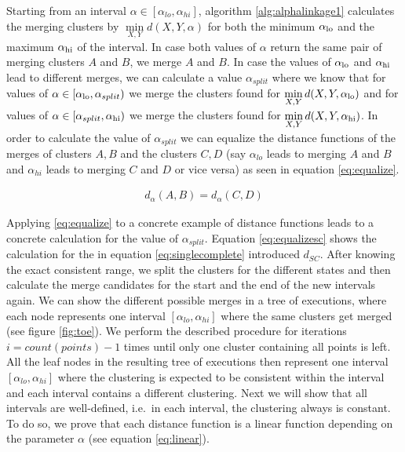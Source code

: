 Starting from an interval $\alpha \in [\alpha_{lo}, \alpha_{hi}]$, algorithm \ref{alg:alphalinkage1} calculates the merging clusters by $\min\limits_{X, Y} d(X,Y,\alpha)$ for both the minimum $\alpha_\text{lo}$ and the maximum $\alpha_\text{hi}$ of the interval. In case both values of $\alpha$ return the same pair of merging clusters $A$ and $B$, we merge $A$ and $B$. In case the values of $\alpha_\text{lo}$ and $\alpha_\text{hi}$ lead to different merges, we can calculate a value $\alpha_{split}$ where we know that for values of $\alpha \in [\alpha_\text{lo}, \alpha_{split})$ we merge the clusters found for $\min\limits_{X, Y} d(X,Y,\alpha_\text{lo})$ and for values of $\alpha \in [\alpha_{split}, \alpha_\text{hi})$ we merge the clusters found for $\min\limits_{X, Y} d(X,Y,\alpha_\text{hi})$. In order to calculate the value of $\alpha_{split}$ we can equalize the distance functions of the merges of clusters $A, B$ and the clusters $C, D$ (say $\alpha_{lo}$ leads to merging $A$ and $B$ and $\alpha_{hi}$ leads to merging $C$ and $D$ or vice versa) as seen in equation \ref{eq:equalize}. 

\begin{equation}
    \begin{aligned}
        d_{\alpha}(A,B) = d_{\alpha}(C,D)
    \end{aligned}
    \label{eq:equalize}
\end{equation}

Applying \ref{eq:equalize} to a concrete example of distance functions leads to a concrete calculation for the value of $\alpha_{split}$. Equation \ref{eq:equalizesc} shows the calculation for the in equation \ref{eq:singlecomplete} introduced $d_{SC}$. After knowing the exact consistent range, we split the clusters for the different states and then calculate the merge candidates for the start and the end of the new intervals again. We can show the different possible merges in a tree of executions, where each node represents one interval $[\alpha_{lo}, \alpha_{hi}]$ where the same clusters get merged (see figure \ref{fig:toe}). We perform the described procedure for iterations $i = count(points) -1$ times until only one cluster containing all points is left. All the leaf nodes in the resulting tree of executions then represent one interval $[\alpha_{lo}, \alpha_{hi}]$ where the clustering is expected to be consistent within the interval and each interval contains a different clustering. Next we will show that all intervals are well-defined, i.e.\ in each interval, the clustering always is constant. To do so, we prove that each distance function is a linear function depending on the parameter $\alpha$ (see equation \ref{eq:linear}).

